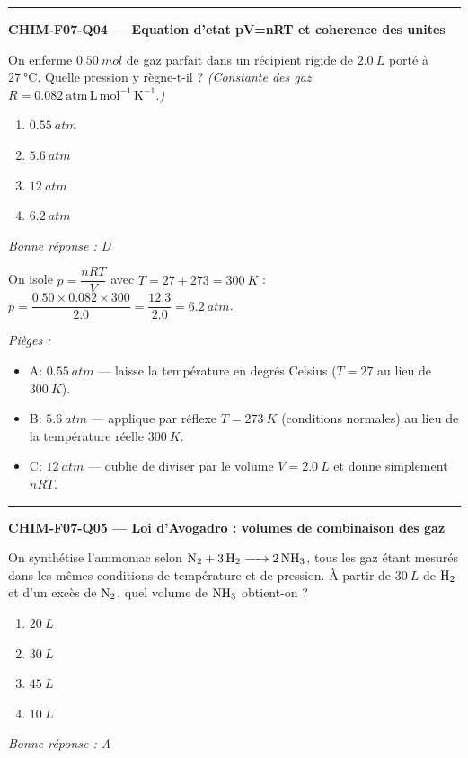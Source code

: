 \documentclass[11pt,a4paper]{article}
\begin{document}
\vspace{8pt}\hrule\vspace{8pt}
\noindent\textbf{CHIM-F07-Q04 --- Equation d'etat pV=nRT et coherence des unites}\par
On enferme $\qty{0.50}{mol}$ de gaz parfait dans un récipient rigide de $\qty{2.0}{L}$ porté à $\qty{27}{\degreeCelsius}$. Quelle pression y règne-t-il ? \textit{(Constante des gaz $R=\num{0.082}\ \mathrm{atm\,L\,mol^{-1}\,K^{-1}}$.)}
\begin{enumerate}[label=\Alph*)]
\item $\qty{0.55}{atm}$
\item $\qty{5.6}{atm}$
\item $\qty{12}{atm}$
\item $\qty{6.2}{atm}$
\end{enumerate}
\textit{Bonne réponse : D}\par
On isole $p=\dfrac{nRT}{V}$ avec $T=27+273=\qty{300}{K}$ : $p=\dfrac{\num{0.50}\times\num{0.082}\times300}{\num{2.0}}=\dfrac{\num{12.3}}{\num{2.0}}=\qty{6.2}{atm}$.\par
\textit{Pièges :}
\begin{itemize}
\item A: $\qty{0.55}{atm}$ --- laisse la température en degrés Celsius ($T=27$ au lieu de $\qty{300}{K}$).
\item B: $\qty{5.6}{atm}$ --- applique par réflexe $T=\qty{273}{K}$ (conditions normales) au lieu de la température réelle $\qty{300}{K}$.
\item C: $\qty{12}{atm}$ --- oublie de diviser par le volume $V=\qty{2.0}{L}$ et donne simplement $nRT$.
\end{itemize}
\vspace{8pt}\hrule\vspace{8pt}
\noindent\textbf{CHIM-F07-Q05 --- Loi d'Avogadro : volumes de combinaison des gaz}\par
On synthétise l'ammoniac selon $\ce{N2 + 3H2 -> 2NH3}$, tous les gaz étant mesurés dans les mêmes conditions de température et de pression. À partir de $\qty{30}{L}$ de $\ce{H2}$ et d'un excès de $\ce{N2}$, quel volume de $\ce{NH3}$ obtient-on ?
\begin{enumerate}[label=\Alph*)]
\item $\qty{20}{L}$
\item $\qty{30}{L}$
\item $\qty{45}{L}$
\item $\qty{10}{L}$
\end{enumerate}
\textit{Bonne réponse : A}\par
\end{document}
